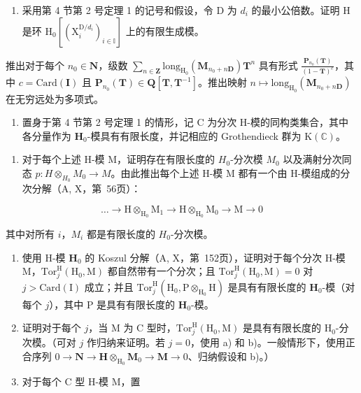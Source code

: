\begin{enumerate}
\def\labelenumi{\alph{enumi})}
\setcounter{enumi}{1}
\tightlist
\item
  采用第 4 节第 2 号定理 1 的记号和假设，令 D 为 \(d_{i}\) 的最小公倍数。证明 H 是环 \(\mathrm{H}_{0}[(\mathrm{X}_{i}^{\mathrm{D}/d_{i}})_{i\in\mathbb{I}}]\) 上的有限生成模。
\end{enumerate}

推出对于每个 \(n_{0}\in\mathbf{N}\)，级数 \(\sum_{n\in\mathbf{Z}}\mathrm{long}_{\mathrm{H}_{0}}(\mathbf{M}_{n_{0}+n\mathbf{D}})\mathbf{T}^{n}\) 具有形式 \(\frac{\mathbf{P}_{n_{0}}(\mathbf{T})}{(1-\mathbf{T})^{c}}\)，其中 \(c=\mathrm{Card}(\mathbf{I})\) 且 \(\mathbf{P}_{n_{0}}(\mathbf{T})\in\mathbf{Q}[\mathbf{T},\mathbf{T}^{-1}]\)。推出映射 \(n\mapsto\mathrm{long}_{\mathrm{H}_{0}}(\mathbf{M}_{n_{0}+n\mathbf{D}})\) 在无穷远处为多项式。

\begin{enumerate}
\def\labelenumi{\arabic{enumi})}
\setcounter{enumi}{3}
\tightlist
\item
  置身于第 4 节第 2 号定理 1 的情形，记 C 为分次 H-模的同构类集合，其中各分量作为 \(\mathbf{H}_0\)-模具有有限长度，并记相应的 Grothendieck 群为 \(\mathrm{K}(\mathbb{C})\)。
\end{enumerate}

\begin{enumerate}
\def\labelenumi{\alph{enumi})}
\tightlist
\item
  对于每个上述 H-模 M，证明存在有限长度的 \(H_{0}\)-分次模 \(M_{0}\) 以及满射分次同态 \(p:H\otimes_{H_{0}}M_{0}\to M\)。由此推出每个上述 H-模 M 都有一个由 H-模组成的分次分解（A, X，第~56页）：
\end{enumerate}

\[
\dots \rightarrow \mathrm{H} \otimes_ {\mathrm{H} _ {0}} \mathrm{M} _ {1} \rightarrow \mathrm{H} \otimes_ {\mathrm{H} _ {0}} \mathrm{M} _ {0} \rightarrow \mathrm{M} \rightarrow 0
\]

其中对所有 \(i\)，\(M_{i}\) 都是有限长度的 \(H_{0}\)-分次模。

\begin{enumerate}
\def\labelenumi{\alph{enumi})}
\setcounter{enumi}{1}
\item
  使用 H-模 \(\mathbf{H}_0\) 的 Koszul 分解（A, X，第~152页），证明对于每个分次 H-模 M，\(\mathrm{Tor}_j^{\mathrm{H}}(\mathrm{H}_0,\mathrm{M})\) 都自然带有一个分次；且 \(\mathrm{Tor}_j^{\mathrm{H}}(\mathrm{H}_0,\mathrm{M}) = 0\) 对 \(j > \mathrm{Card}(\mathrm{I})\) 成立；并且 \(\mathrm{Tor}_j^{\mathrm{H}}(\mathrm{H}_0,\mathrm{P}\otimes_{\mathrm{H}_0}\mathrm{H})\) 是具有有限长度的 \(\mathbf{H}_0\)-模（对每个 \(j\)），其中 P 是具有有限长度的 \(\mathbf{H}_0\)-模。
\item
  证明对于每个 \(j\)，当 M 为 C 型时，\(\mathrm{Tor}_{j}^{\mathrm{H}}(\mathrm{H}_{0}, \mathrm{M})\) 是具有有限长度的 \(\mathrm{H}_{0}\)-分次模。（可对 \(j\) 作归纳来证明。若 \(j = 0\)，使用 a) 和 b)。一般情形下，使用正合序列 \(0 \to \mathbf{N} \to \mathbf{H} \otimes_{\mathrm{H}_{0}} \mathbf{M}_{0} \to \mathbf{M} \to 0\)、归纳假设和 b)。）
\item
  对于每个 C 型 H-模 M，置
\end{enumerate}

